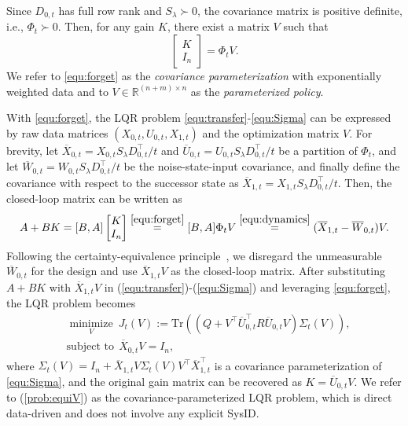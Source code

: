 Since $D_{0,t}$ has full row rank and $S_{\lambda}\succ 0$, the covariance matrix is positive definite, i.e., $\Phi_{t} \succ 0$. Then, for any gain $K$, there exist a matrix $V$ such that
\begin{equation}\label{equ:forget}
\begin{bmatrix}
K \\
I_n
\end{bmatrix}=  \Phi_{t} V.
\end{equation}
We refer to \eqref{equ:forget} as the \textit{covariance parameterization} with exponentially weighted data and to $V\in \mathbb{R}^{(n+m)\times n}$ as the \textit{parameterized policy}.

With \eqref{equ:forget}, the LQR problem \eqref{equ:transfer}-\eqref{equ:Sigma} can be expressed by raw data matrices $(X_{0,t}, U_{0,t}, X_{1,t})$ and the optimization matrix $V$. For brevity, let $\overline{X}_{0,t}= X_{0,t}S_{\lambda}D_{0,t}^{\top}/t$ and $\overline{U}_{0,t}=  U_{0,t}S_{\lambda}D_{0,t}^{\top}/t$ be a partition of $\Phi_t$, and let
$\overline{W}_{0,t}=  W_{0,t}S_{\lambda}D_{0,t}^{\top}/t$ be the noise-state-input covariance, and finally define the covariance with respect to the successor state as $\overline{X}_{1,t}=  X_{1,t}S_{\lambda}D_{0,t}^{\top}/t$.
Then, the closed-loop matrix can be written as
\begin{equation}
A+BK=[B,A]\begin{bmatrix}
K \\
I_n
\end{bmatrix}\overset{\eqref{equ:forget}}{=}[B,A]\Phi_t V\overset{\eqref{equ:dynamics}}{=}(\overline{X}_{1,t} - \overline{W}_{0,t})V.
\end{equation}
Following the certainty-equivalence principle~\cite{dorfler2021certainty}, we disregard the
unmeasurable $\overline{W}_{0,t}$ for the design and use $\overline{X}_{1,t}V$ as the closed-loop matrix. After substituting $A+BK$  with $\overline{X}_{1,t}V$ in (\ref{equ:transfer})-(\ref{equ:Sigma}) and leveraging \eqref{equ:forget}, the LQR problem becomes 
\begin{equation}\label{prob:equiV}
\begin{aligned}
&\mathop{\text {minimize}}\limits_{V}~J_t(V) :=\text{Tr}\left((Q+V^{\top}\overline{U}_{0,t}^{\top}R\overline{U}_{0,t}V)\Sigma_t(V)\right),\\
&\text{subject to}~ ~\overline{X}_{0,t}V= I_n,
\end{aligned}
\end{equation}
where $\Sigma_t(V) = I_n + \overline{X}_{1,t}V\Sigma_t(V) V^{\top}\overline{X}_{1,t}^{\top}$ is a covariance parameterization of \eqref{equ:Sigma},
and the original gain matrix can be recovered as $K = \overline{U}_{0,t}V$. We refer to (\ref{prob:equiV}) as the covariance-parameterized LQR problem, which is direct data-driven and does not involve any explicit SysID.



